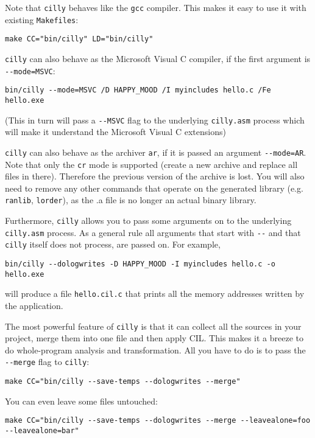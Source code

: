 \documentclass{article}
\def\t#1{{\tt #1}}
\begin{document}
 Note that \t{cilly} behaves like the \t{gcc} compiler. This makes it
easy to use it with existing \t{Makefiles}:
\begin{verbatim}
make CC="bin/cilly" LD="bin/cilly"
\end{verbatim}

 \t{cilly} can also behave as the Microsoft Visual C compiler, if the first
 argument is \t{-{}-mode=MSVC}:
\begin{verbatim}
bin/cilly --mode=MSVC /D HAPPY_MOOD /I myincludes hello.c /Fe hello.exe
\end{verbatim}

 (This in turn will pass a \t{-{}-MSVC} flag to the underlying \t{cilly.asm}
 process which will make it understand the Microsoft Visual C extensions)

 \t{cilly} can also behave as the archiver \t{ar}, if it is passed an
 argument \t{-{}-mode=AR}. Note that only the \t{cr} mode is supported
 (create a new archive and replace all files in there).  Therefore the
 previous version of the archive is lost. You will also need to remove
 any other commands that operate on the generated library
 (e.g. \t{ranlib}, \t{lorder}), as the .a file is no longer an actual
 binary library.

 Furthermore, \t{cilly} allows you to pass some arguments on to the
underlying \t{cilly.asm} process. As a general rule all arguments that start
with \t{-{}-} and that \t{cilly} itself does not process, are passed on. For
example, 
\begin{verbatim}
bin/cilly --dologwrites -D HAPPY_MOOD -I myincludes hello.c -o hello.exe
\end{verbatim}

 will produce a file \t{hello.cil.c} that prints all the memory addresses
written by the application. 

 The most powerful feature of \t{cilly} is that it can collect all the
sources in your project, merge them into one file and then apply CIL. This
makes it a breeze to do whole-program analysis and transformation. All you
have to do is to pass the \t{-{}-merge} flag to \t{cilly}:
\begin{verbatim}
make CC="bin/cilly --save-temps --dologwrites --merge"
\end{verbatim}

 You can even leave some files untouched:
\begin{verbatim}
make CC="bin/cilly --save-temps --dologwrites --merge --leavealone=foo --leavealone=bar"
\end{verbatim}
\end{document}

